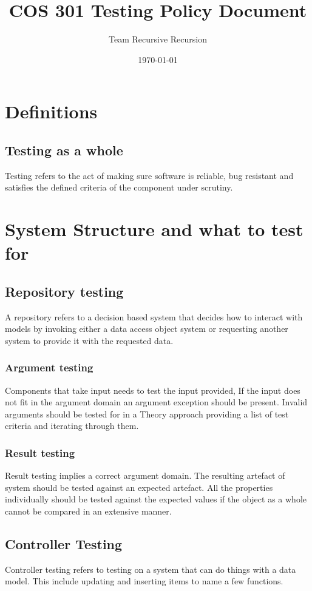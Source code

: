 \documentclass[12pt]{article}
\author{Team Recursive Recursion}
\date{\today}
\title{COS 301 Testing Policy Document}
\begin{document}
\maketitle

\section{Definitions}

\subsection{Testing as a whole}
Testing refers to the act of making sure software is reliable, bug resistant and
satisfies the defined criteria of the component under scrutiny.

\section{System Structure and what to test for}

\subsection{Repository testing}
A repository refers to a decision based system that decides how to interact with models by
invoking either a data access object system or requesting another system to
provide it with the requested data.

\subsubsection{Argument testing}
\label{sec:org02bde11}
Components that take input needs to test the input provided, If the input
does not fit in the argument domain an argument exception should be present. 
Invalid arguments should be tested for in a Theory approach providing a list
of test criteria and iterating through them.

\subsubsection{Result testing}
Result testing implies a correct argument domain. The resulting artefact of
system should be tested against an expected artefact. All the properties
individually should be tested against the expected values if the object as a
whole cannot be compared in an extensive manner.

\subsection{Controller Testing}
Controller testing refers to testing on a system that can do things with a
data model. This include updating and inserting items to name a few functions.
\end{document}
